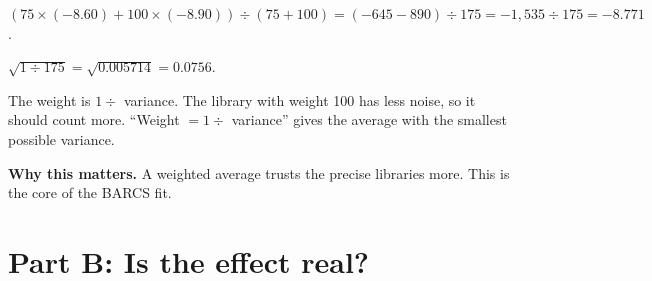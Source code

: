 \documentclass[12pt]{article}
\newcommand{\why}[1]{\par\smallskip\noindent\textcolor{barcsgreen!70!black}{\textbf{Why this matters.}} #1}
\begin{document}
\begin{exlist}
\item
\begin{parts}
\item $(75 \times (-8.60) + 100 \times (-8.90)) \div (75 + 100) = (-645 -
  890) \div 175 = -1{,}535 \div 175 = -8.771$.
\item $\sqrt{1 \div 175} = \sqrt{0.005714} = 0.0756$.
\item The weight is $1 \div$ variance. The library with weight 100 has less
  noise, so it should count more. ``Weight $= 1 \div$ variance'' gives the
  average with the smallest possible variance.
\end{parts}
\why{A weighted average trusts the precise libraries more. This is the core
of the BARCS fit.}
\end{exlist}

\section*{Part B: Is the effect real?}
\end{document}
